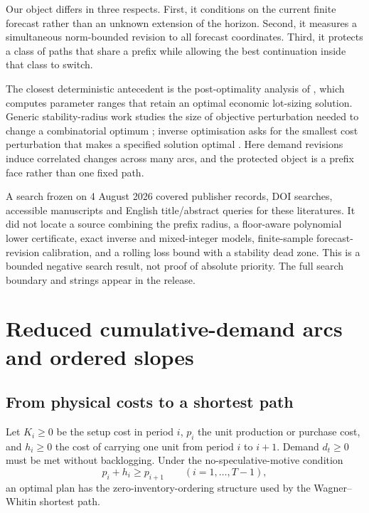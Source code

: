 \documentclass[11pt]{article}
\theoremstyle{definition}
\begin{document}
Our object differs in three respects. First, it conditions on the current finite forecast rather than an unknown extension of the horizon. Second, it measures a simultaneous norm-bounded revision to all forecast coordinates. Third, it protects a class of paths that share a prefix while allowing the best continuation inside that class to switch.

The closest deterministic antecedent is the post-optimality analysis of \textcite{VanHoeselWagelmans1993}, which computes parameter ranges that retain an optimal economic lot-sizing solution. Generic stability-radius work studies the size of objective perturbation needed to change a combinatorial optimum \parencite{ChakravartiWagelmans1998}; inverse optimisation asks for the smallest cost perturbation that makes a specified solution optimal \parencite{AhujaOrlin2001}. Here demand revisions induce correlated changes across many arcs, and the protected object is a prefix face rather than one fixed path.

A search frozen on 4 August 2026 covered publisher records, DOI searches, accessible manuscripts and English title/abstract queries for these literatures. It did not locate a source combining the prefix radius, a floor-aware polynomial lower certificate, exact inverse and mixed-integer models, finite-sample forecast-revision calibration, and a rolling loss bound with a stability dead zone. This is a bounded negative search result, not proof of absolute priority. The full search boundary and strings appear in the release.

\section{Reduced cumulative-demand arcs and ordered slopes}

\subsection{From physical costs to a shortest path}

Let $K_i\ge0$ be the setup cost in period $i$, $p_i$ the unit production or purchase cost, and $h_i\ge0$ the cost of carrying one unit from period $i$ to $i+1$. Demand $d_t\ge0$ must be met without backlogging. Under the no-speculative-motive condition
\begin{equation}\label{eq:wwcondition}
p_i+h_i\ge p_{i+1}\qquad(i=1,\ldots,T-1),
\end{equation}
an optimal plan has the zero-inventory-ordering structure used by the Wagner--Whitin shortest path.
\end{document}
